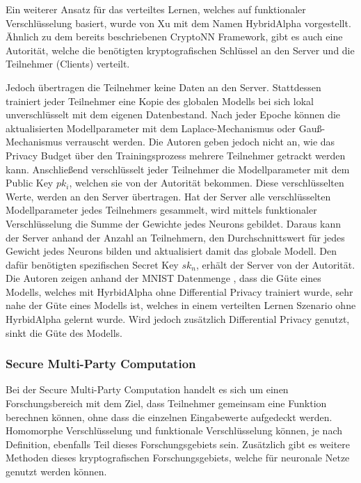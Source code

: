 Ein weiterer Ansatz für das verteiltes Lernen, welches auf funktionaler Verschlüsselung basiert, wurde von Xu \etal \cite{P-33} mit dem Namen HybridAlpha vorgestellt.
Ähnlich zu dem bereits beschriebenen CryptoNN Framework, gibt es auch eine Autorität, welche die benötigten kryptografischen Schlüssel an den Server und die Teilnehmer (Clients) verteilt.

Jedoch übertragen die Teilnehmer keine Daten an den Server.
Stattdessen trainiert jeder Teilnehmer eine Kopie des globalen Modells bei sich lokal unverschlüsselt mit dem eigenen Datenbestand.
Nach jeder Epoche können die aktualisierten Modellparameter mit dem Laplace-Mechanismus oder Gauß-Mechanismus verrauscht werden.
Die Autoren geben jedoch nicht an, wie das Privacy Budget über den Trainingsprozess mehrere Teilnehmer getrackt werden kann.
Anschließend verschlüsselt jeder Teilnehmer die Modellparameter mit dem Public Key $pk_i$, welchen sie von der Autorität bekommen.
Diese verschlüsselten Werte, werden an den Server übertragen.
Hat der Server alle verschlüsselten Modellparameter jedes Teilnehmers gesammelt, wird mittels funktionaler Verschlüsselung die Summe der Gewichte jedes Neurons gebildet.
Daraus kann der Server anhand der Anzahl an Teilnehmern, den Durchschnittswert für jedes Gewicht jedes Neurons bilden und aktualisiert damit das globale Modell.
Den dafür benötigten spezifischen Secret Key $sk_n$, erhält der Server von der Autorität.
Die Autoren zeigen anhand der MNIST Datenmenge \cite{D-MNIST}, dass die Güte eines Modells, welches mit HyrbidAlpha ohne Differential Privacy trainiert wurde, sehr nahe der Güte eines Modells ist, welches in einem verteilten Lernen Szenario ohne HyrbidAlpha gelernt wurde. 
Wird jedoch zusätzlich Differential Privacy genutzt, sinkt die Güte des Modells. 


\subsubsection*{Secure Multi-Party Computation}

Bei der Secure Multi-Party Computation handelt es sich um einen Forschungsbereich mit dem Ziel, dass Teilnehmer gemeinsam eine Funktion berechnen können, ohne dass die einzelnen Eingabewerte aufgedeckt werden. 
Homomorphe Verschlüsselung und funktionale Verschlüsselung können, je nach Definition, ebenfalls Teil dieses Forschungsgebiets sein.
Zusätzlich gibt es weitere Methoden dieses kryptografischen Forschungsgebiets, welche für neuronale Netze genutzt werden können.

